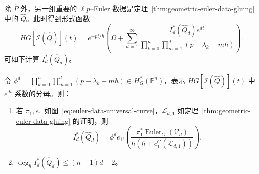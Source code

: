 除 $\widehat P$ 外，另一组重要的 $\ell p$--Euler 数据是定理~\ref{thm:geometric-euler-data-gluing} 中的 $\widehat Q$。此时得到形式函数
\[
HG[\mathcal I(\widehat Q)](t)
=e^{-pt/\hbar}\left(\Omega+\sum_{d=1}^{\infty}
\frac{I_d^*(\widehat Q_d)e^{dt}}
{\prod_{k=0}^n\prod_{m=1}^d(p-\lambda_k-m\hbar)}\right).
\]
可如下计算 $I_d^*(\widehat Q_d)$。
\begin{lemma}\label{lem:geometric-euler-data-hypergeometric-bound}
令 $\phi^d=\prod_{k=0}^n\prod_{m=1}^d(p-\lambda_k-m\hbar)\in H_G^*(\mathbb P^n)$，表示 $HG[\mathcal I(\widehat Q)](t)$ 中 $e^{dt}$ 系数的分母。则：
\begin{enumerate}[label=(\roman*)]
\item 若 $\pi_1,e_1$ 如图~\eqref{eq:euler-data-universal-curve}，$\mathcal L_{d,1}$ 如定理~\ref{thm:geometric-euler-data-gluing} 的证明，则
\[
I_d^*(\widehat Q_d)=\phi^d e_{1!}\left(
\frac{\pi_1^*\operatorname{Euler}_G(\mathcal V_d)}
{\hbar(\hbar+c_1^G(\mathcal L_{d,1}))}\right).
\]
\item $\deg_\hbar I_d^*(\widehat Q_d)\le(n+1)d-2$。
\end{enumerate}
\end{lemma}
